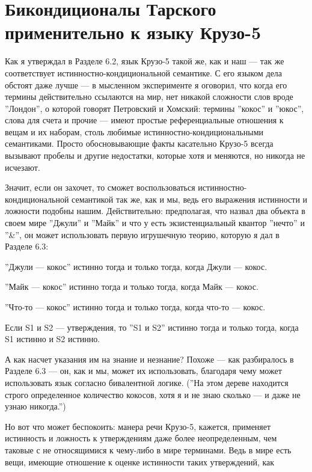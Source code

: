 \documentclass[11pt]{book}
\begin{document}
\section{Бикондиционалы Тарского применительно к языку Крузо-5}

Как я утверждал в Разделе 6.2, язык Крузо-5 такой же, как и наш --- так же соответствует истинностно-кондициональной семантике. С его языком дела обстоят даже лучше --- в мысленном эксперименте я оговорил, что когда его термины действительно ссылаются на мир, нет никакой сложности слов вроде ''Лондон'', о которой говорят Петровский и Хомский: термины ''кокос'' и ''юкос'', слова для счета и прочие --- имеют простые референциальные отношения к вещам и их наборам, столь любимые истинностно-кондициональными семантиками. Просто обосновывающие факты касательно Крузо-5 всегда вызывают пробелы и другие недостатки, которые хотя и меняются, но никогда не исчезают.

Значит, если он захочет, то сможет воспользоваться истинностно-кондициональной семантикой так же, как и мы, ведь его выражения истинности и ложности подобны нашим. Действительно: предполагая, что назвал два объекта в своем мире ''Джули'' и ''Майк'' и что у есть экзистенциальный квантор ''нечто'' и ''\&'', он может использовать первую игрушечную теорию, которую я дал в Разделе 6.3:

\smallskip

''Джули --- кокос'' истинно тогда и только тогда, когда Джули --- кокос.

''Майк --- кокос'' истинно тогда и только тогда, когда Майк --- кокос.

''Что-то --- кокос'' истинно тогда и только тогда, когда что-то --- кокос.

Если S1 и S2 --- утверждения, то ''S1 и S2'' истинно тогда и только тогда, когда S1 истинно и S2 истинно.

\smallskip

А как насчет указания им на знание и незнание? Похоже --- как разбиралось в Разделе 6.3 --- он, как и мы, может их использовать, благодаря чему может использовать язык согласно бивалентной логике. (''На этом дереве находится строго определенное количество кокосов, хотя я и не знаю сколько --- и даже не узнаю никогда.'')

Но вот что может беспокоить: манера речи Крузо-5, кажется, применяет истинность и ложность к утверждениям даже более неопределенным, чем таковые с не относящимися к чему-либо в мире терминами. Ведь в мире есть вещи, имеющие отношение к оценке истинности таких утверждений, как
\end{document}
